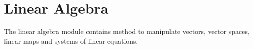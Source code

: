\section{Linear Algebra}
\label{sec:linalg}

The linear algebra module contains method to manipulate vectors, vector spaces, linear maps and systems of linear equations. 




